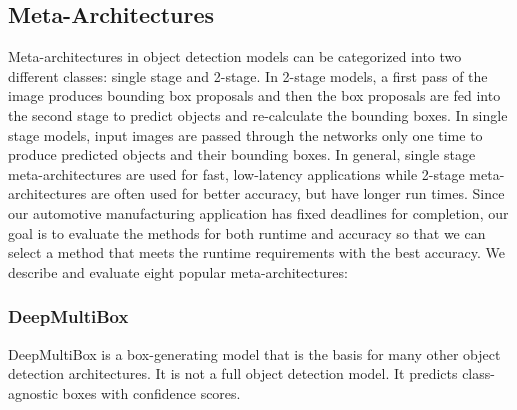 \documentclass[conference]{IEEEtran}
\newcommand{\alnote}[1]{ {\textcolor{blue} { ***andre: #1 }}}
\newcommand{\dungnote}[1]{ {\textcolor{orange} { ***dung: #1 }}}
\newcommand{\alnote}[1]{}
\newcommand{\dungnote}[1]{}
\begin{document}



\subsection{Meta-Architectures}


Meta-architectures in object detection models can be categorized into two different classes: single stage and 2-stage. In 2-stage models, a first pass of the image produces bounding box proposals and then the box proposals are fed into the second stage to predict objects and re-calculate the bounding boxes. 
In single stage models, input images are passed through the networks only one time to produce predicted objects and their bounding boxes.  
In general, single stage meta-architectures are used for fast, low-latency applications while 2-stage meta-architectures are often used for better accuracy, but have longer run times.  
Since our automotive manufacturing application has fixed deadlines for completion, our goal is to evaluate the methods for both runtime and accuracy so that we can select a method that meets the runtime requirements with the best accuracy.
We describe and evaluate eight popular meta-architectures:

\subsubsection{DeepMultiBox}
DeepMultiBox is a box-generating model that is the basis for many other object detection architectures. It is not a full object detection model. It predicts class-agnostic boxes with confidence scores.
\end{document}
